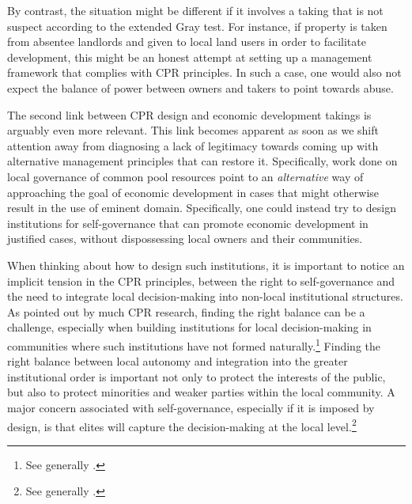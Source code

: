 By contrast, the situation might be different if it involves a taking that is not suspect according to the extended Gray test. For instance, if property is taken from absentee landlords and given to local land users in order to facilitate development, this might be an honest attempt at setting up a management framework that complies with CPR principles. In such a case, one would also not expect the balance of power between owners and takers to point towards abuse.

The second link between CPR design and economic development takings is arguably even more relevant. This link becomes apparent as soon as we shift attention away from diagnosing a lack of legitimacy towards coming up with alternative management principles that can restore it. Specifically, work done on local governance of common pool resources point to an {\it alternative} way of approaching the goal of economic development in cases that might otherwise result in the use of eminent domain. Specifically, one could instead try to design institutions for self-governance that can promote economic development in justified cases, without dispossessing local owners and their communities.

When thinking about how to design such institutions, it is important to notice an implicit tension in the CPR principles, between the right to self-governance and the need to integrate local decision-making into non-local institutional structures. As pointed out by much CPR research, finding the right balance can be a challenge, especially when building institutions for local decision-making in communities where such institutions have not formed naturally.\footnote{See generally \cite{cox10}.} Finding the right balance between local autonomy and integration into the greater institutional order is important not only to protect the interests of the public, but also to protect minorities and weaker parties within the local community. A major concern associated with self-governance, especially if it is imposed by design, is that elites will capture the decision-making at the local level.\footnote{See generally \cite{andersson08}.} 

